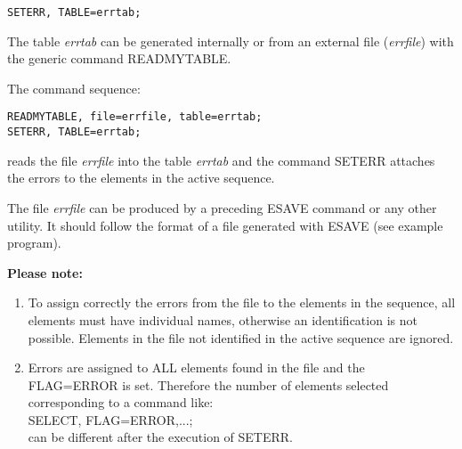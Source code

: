 \begin{verbatim}
SETERR, TABLE=errtab;
\end{verbatim}
The table \textit{errtab} can be generated internally or from an
external file (\textit{errfile}) with the generic command READMYTABLE.  
 

The command sequence: 
\begin{verbatim}
READMYTABLE, file=errfile, table=errtab;
SETERR, TABLE=errtab;
\end{verbatim}
reads the file \textit{errfile} into the table \textit{errtab} and the
command SETERR attaches the errors to the elements in the active
sequence.  

The file \textit{errfile} can be produced by a preceding ESAVE command
or any other utility. It should follow the format of a file generated
with ESAVE (see example program). 

{\bf Please note:}
\begin{enumerate}
   \item To assign correctly the errors from the file to the elements in
     the sequence, all elements must have individual names, otherwise an
     identification is not possible. Elements in the file not identified
     in the active sequence are ignored.  
   \item Errors are assigned to ALL elements found in the file and the
     FLAG=ERROR is set. Therefore the number of elements selected
     corresponding to a command like:  
     \\ SELECT, FLAG=ERROR,...;
     \\ can be different after the execution of SETERR. 
\end{enumerate}


